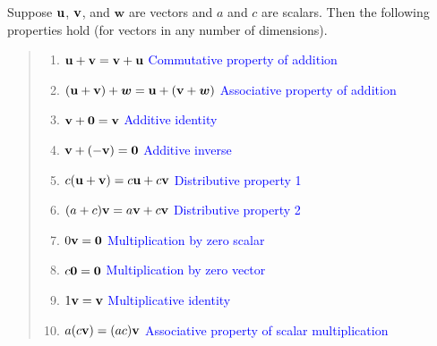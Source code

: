 \documentclass[mathNotesPreamble]{subfiles}
\begin{document}
  \begin{thmBox*}
    Suppose ${\mathbf{u}}$, ${\mathbf{v}}$, and $\bm{w}$ are vectors and $a$ and $c$ are scalars. Then the following properties hold (for vectors in any number of dimensions).
    \begin{quote}
      \begin{enumerate}
        \item 
          ${\mathbf{u}}+{\mathbf{v}}={\mathbf{v}}+{\mathbf{u}}$
          \tab \textcolor{blue}{Commutative property of addition}
        \item 
          ${\left({\mathbf{u}}+{\mathbf{v}}\right)}+\bm w={\mathbf{u}}+{\left({\mathbf{v}}+\bm w\right)}$
          \tab \textcolor{blue}{Associative property of addition}
        \item 
          ${\mathbf{v}}+\mathbf{0}={\mathbf{v}}$
          \tab \textcolor{blue}{Additive identity}
        \item 
          ${\mathbf{v}}+{\left(-{\mathbf{v}}\right)}=\mathbf{0}$
          \tab \textcolor{blue}{Additive inverse}
        \item 
          $c{\left({\mathbf{u}}+{\mathbf{v}}\right)}=c{\mathbf{u}}+c{\mathbf{v}}$
          \tab \textcolor{blue}{Distributive property 1}
        \item 
          ${\left(a+c\right)}{\mathbf{v}}=a{\mathbf{v}}+c{\mathbf{v}}$
          \tab \textcolor{blue}{Distributive property 2}
        \item 
          $0{\mathbf{v}}=\mathbf{0}$
          \tab \textcolor{blue}{Multiplication by zero scalar}
        \item 
          $c\mathbf{0}=\mathbf{0}$
          \tab \textcolor{blue}{Multiplication by zero vector}
        \item 
          $1{\mathbf{v}}={\mathbf{v}}$
          \tab \textcolor{blue}{Multiplicative identity}
        \item 
          $a{\left(c{\mathbf{v}}\right)}={\left(ac\right)}{\mathbf{v}}$ 
          \tab \textcolor{blue}{Associative property of scalar multiplication}
      \end{enumerate}
    \end{quote}
  \end{thmBox*}

  \pagebreak
\end{document}
